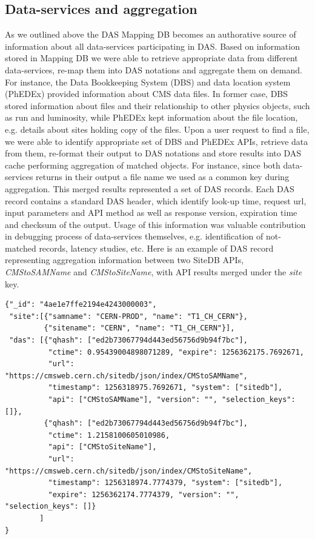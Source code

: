 \documentclass[a4paper]{jpconf}
\begin{document}
\subsection{Data-services and aggregation}
As we outlined above the DAS Mapping DB becomes an authorative
source of information about all data-services participating in DAS.
Based on information stored in Mapping DB we were able to 
retrieve appropriate data from different data-services, re-map them into 
DAS notations and aggregate them on demand. For instance, the Data 
Bookkeeping System (DBS) and data location system (PhEDEx)
provided information about CMS data files. In former case, DBS 
stored information about files and their relationship to other 
physics objects, such as run and luminosity, while PhEDEx kept
information about the file location, e.g. details about sites 
holding copy of the files. Upon a user request to find a file, 
we were able to identify appropriate set of DBS and PhEDEx APIs, 
retrieve data from them, re-format their output to DAS notations 
and store results into DAS cache performing aggregation of matched 
objects. For instance, since both data-services returns in their
output a file name we used as a common key during aggregation.
This merged results represented a set of DAS records. Each DAS
record contains a standard DAS header, which identify look-up time,
request url, input parameters and API method as well as response 
version, expiration time and checksum of the output. Usage of this 
information was valuable contribution in debugging process of
data-services themselves, e.g. identification of not-matched records, 
latency studies, etc. Here is an example of DAS record representing
aggregation information between two SiteDB APIs, {\it CMStoSAMName} 
and {\it CMStoSiteName}, with API results merged under the {\it site} key.
\begin{verbatim}
{"_id": "4ae1e7ffe2194e4243000003", 
 "site":[{"samname": "CERN-PROD", "name": "T1_CH_CERN"}, 
         {"sitename": "CERN", "name": "T1_CH_CERN"}], 
 "das": [{"qhash": ["ed2b73067794d443ed56756d9b94f7bc"], 
          "ctime": 0.95439004898071289, "expire": 1256362175.7692671, 
          "url": "https://cmsweb.cern.ch/sitedb/json/index/CMStoSAMName", 
          "timestamp": 1256318975.7692671, "system": ["sitedb"], 
          "api": ["CMStoSAMName"], "version": "", "selection_keys": []}, 
         {"qhash": ["ed2b73067794d443ed56756d9b94f7bc"], 
          "ctime": 1.2158100605010986, 
          "api": ["CMStoSiteName"], 
          "url": "https://cmsweb.cern.ch/sitedb/json/index/CMStoSiteName", 
          "timestamp": 1256318974.7774379, "system": ["sitedb"], 
          "expire": 1256362174.7774379, "version": "", "selection_keys": []}
        ]
}
\end{verbatim}
\end{document}
